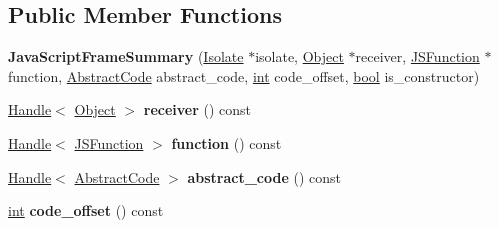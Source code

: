 \subsection*{Public Member Functions}
\begin{DoxyCompactItemize}
\item 
\mbox{\label{classv8_1_1internal_1_1FrameSummary_1_1JavaScriptFrameSummary_a26d630865d6d37e1cf7b196843241a16}} 
{\bfseries Java\+Script\+Frame\+Summary} (\mbox{\hyperlink{classv8_1_1internal_1_1Isolate}{Isolate}} $\ast$isolate, \mbox{\hyperlink{classv8_1_1internal_1_1Object}{Object}} $\ast$receiver, \mbox{\hyperlink{classv8_1_1internal_1_1JSFunction}{J\+S\+Function}} $\ast$function, \mbox{\hyperlink{classv8_1_1internal_1_1AbstractCode}{Abstract\+Code}} abstract\+\_\+code, \mbox{\hyperlink{classint}{int}} code\+\_\+offset, \mbox{\hyperlink{classbool}{bool}} is\+\_\+constructor)
\item 
\mbox{\label{classv8_1_1internal_1_1FrameSummary_1_1JavaScriptFrameSummary_ac9daf7f06314f6d1d99ee31c5d03ec58}} 
\mbox{\hyperlink{classv8_1_1internal_1_1Handle}{Handle}}$<$ \mbox{\hyperlink{classv8_1_1internal_1_1Object}{Object}} $>$ {\bfseries receiver} () const
\item 
\mbox{\label{classv8_1_1internal_1_1FrameSummary_1_1JavaScriptFrameSummary_ad4bd2fe383f118367b134a40b306f8b0}} 
\mbox{\hyperlink{classv8_1_1internal_1_1Handle}{Handle}}$<$ \mbox{\hyperlink{classv8_1_1internal_1_1JSFunction}{J\+S\+Function}} $>$ {\bfseries function} () const
\item 
\mbox{\label{classv8_1_1internal_1_1FrameSummary_1_1JavaScriptFrameSummary_a510037ba6685ffdbbdd5b7351cd7a8b4}} 
\mbox{\hyperlink{classv8_1_1internal_1_1Handle}{Handle}}$<$ \mbox{\hyperlink{classv8_1_1internal_1_1AbstractCode}{Abstract\+Code}} $>$ {\bfseries abstract\+\_\+code} () const
\item 
\mbox{\label{classv8_1_1internal_1_1FrameSummary_1_1JavaScriptFrameSummary_a4388cddb3221eb98b4f083c8ddba7c0d}} 
\mbox{\hyperlink{classint}{int}} {\bfseries code\+\_\+offset} () const

\end{DoxyCompactItemize}
